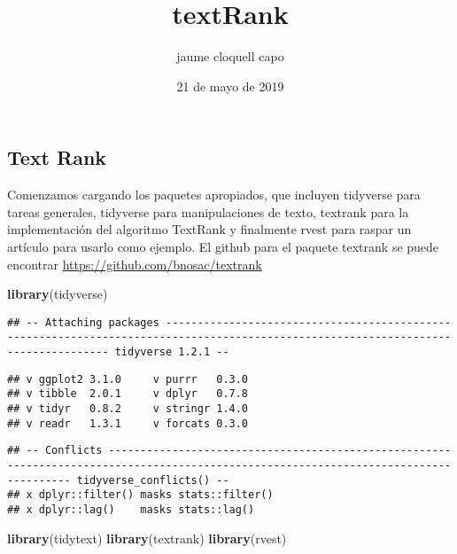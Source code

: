 \documentclass[]{article}
\title{textRank}
\author{jaume cloquell capo}
\date{21 de mayo de 2019}
\newenvironment{Shaded}{\begin{snugshade}}{\end{snugshade}}
\newcommand{\KeywordTok}[1]{\textcolor[rgb]{0.13,0.29,0.53}{\textbf{#1}}}
\newcommand{\NormalTok}[1]{#1}
\begin{document}
\maketitle

\subsection{Text Rank}\label{text-rank}

Comenzamos cargando los paquetes apropiados, que incluyen tidyverse para
tareas generales, tidyverse para manipulaciones de texto, textrank para
la implementación del algoritmo TextRank y finalmente rvest para raspar
un artículo para usarlo como ejemplo. El github para el paquete textrank
se puede encontrar \url{https://github.com/bnosac/textrank}

\begin{Shaded}
\begin{Highlighting}[]
\KeywordTok{library}\NormalTok{(tidyverse)}
\end{Highlighting}
\end{Shaded}

\begin{verbatim}
## -- Attaching packages ----------------------------------------------------------------------------------------------------------------------------------- tidyverse 1.2.1 --
\end{verbatim}

\begin{verbatim}
## v ggplot2 3.1.0     v purrr   0.3.0
## v tibble  2.0.1     v dplyr   0.7.8
## v tidyr   0.8.2     v stringr 1.4.0
## v readr   1.3.1     v forcats 0.3.0
\end{verbatim}

\begin{verbatim}
## -- Conflicts -------------------------------------------------------------------------------------------------------------------------------------- tidyverse_conflicts() --
## x dplyr::filter() masks stats::filter()
## x dplyr::lag()    masks stats::lag()
\end{verbatim}

\begin{Shaded}
\begin{Highlighting}[]
\KeywordTok{library}\NormalTok{(tidytext)}
\KeywordTok{library}\NormalTok{(textrank)}
\KeywordTok{library}\NormalTok{(rvest)}
\end{Highlighting}
\end{Shaded}
\end{document}
